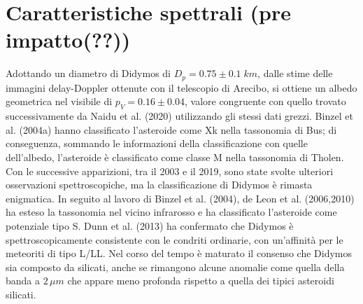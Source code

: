 \documentclass[a4paper,11pt,openright]{book}
\begin{document}
\section{Caratteristiche spettrali (pre impatto(??))}
Adottando un diametro di Didymos di $D_p=0.75 \pm 0.1\; km$, dalle stime delle immagini delay-Doppler ottenute con il telescopio di Arecibo, si ottiene un albedo geometrica nel visibile di $p_V=0.16 \pm 0.04$, valore congruente con quello trovato successivamente da Naidu et al. (2020) utilizzando gli stessi dati grezzi. Binzel et al. (2004a) hanno classificato l'asteroide come Xk nella tassonomia di Bus; di conseguenza, sommando le informazioni della classificazione con quelle dell'albedo, l'asteroide è classificato come classe M nella tassonomia di Tholen.\\
Con le successive apparizioni, tra il 2003 e il 2019, sono state svolte ulteriori osservazioni spettroscopiche, ma la classificazione di Didymos è rimasta enigmatica. In seguito al lavoro di Binzel et al. (2004), de Leon et al. (2006,2010) ha esteso la tassonomia nel vicino infrarosso e ha classificato l'asteroide come potenziale tipo S. Dunn et al. (2013) ha confermato che Didymos è spettroscopicamente consistente con le condriti ordinarie, con un'affinità per le meteoriti di tipo L/LL. Nel corso del tempo è maturato il consenso che Didymos sia composto da silicati, anche se rimangono alcune anomalie come quella della banda a $2\,\mu m$ che appare meno profonda rispetto a quella dei tipici asteroidi silicati. 
\end{document}
